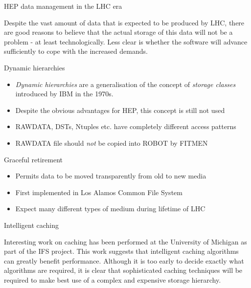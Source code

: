 \begin{slide}
\begin{center}HEP data management in the LHC era\end{center}

Despite the vast amount of data that is expected to be
produced by LHC, there are good reasons to believe that
the actual storage of this data will not be a problem - at
least technologically. Less clear is whether the software
will advance sufficiently to cope with the increased demands.

\end{slide}

\begin{slide}
\begin{center}Dynamic hierarchies\end{center}

\begin{itemize}
\item
{\it Dynamic hierarchies} are a generalisation of the concept
of {\it storage classes} introduced by IBM in the 1970s. 
\item
Despite the obvious advantages for HEP, this concept is still not
used
\item
RAWDATA, DSTs, Ntuples etc. have completely different access
patterns
\item
RAWDATA file should {\it not} be copied into ROBOT by FITMEN
\end{itemize}

\end{slide}

\begin{slide}
\begin{center}Graceful retirement\end{center}

\begin{itemize}
\item
Permits data to be moved transparently from old
to new media
\item
First implemented in Los Alamos Common File System
\item
Expect many different types of medium during
lifetime of LHC
\end{itemize}
\end{slide}

\begin{slide}
\begin{center}Intelligent caching\end{center}

Interesting work on caching has been performed at the
University of Michigan as part of the IFS project.
This work suggests that intelligent caching algorithms
can greatly benefit performance. Although it is too
early to decide exactly what algorithms are required,
it is clear that sophisticated caching techniques
will be required to make best use of a complex and
expensive storage hierarchy.

\end{slide}

